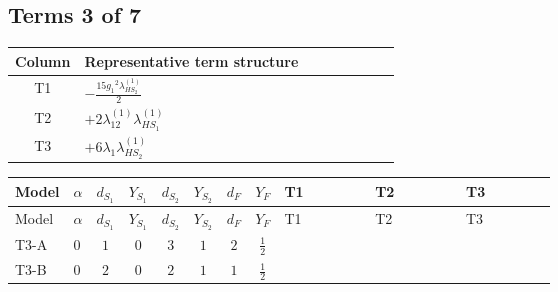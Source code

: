 \documentclass[8pt]{article}
\begin{document}
\begin{landscape}
\subsection*{Terms 3 of 7}
\begin{center}
\begin{tabular}{@{}c >{\raggedright\arraybackslash}p{0.82\linewidth}@{}}
\toprule
Column & Representative term structure \\
\midrule
T1 & \(\displaystyle -\frac{15 {g_1}^2 {\lambda_{HS_2}^{(1)}}}{2}\) \\
\midrule
T2 & \(\displaystyle +2 {\lambda_{12}^{(1)}} {\lambda_{HS_1}^{(1)}}\) \\
\midrule
T3 & \(\displaystyle +6 {\lambda_1} {\lambda_{HS_2}^{(1)}}\) \\
\midrule
\bottomrule
\end{tabular}
\end{center}
\smallskip
\tiny
\begin{longtable}{@{}llcccccc >{\raggedright\arraybackslash}p{0.21\linewidth} >{\raggedright\arraybackslash}p{0.21\linewidth} >{\raggedright\arraybackslash}p{0.21\linewidth}@{}}
\toprule
Model & $\alpha$ & $d_{S_1}$ & $Y_{S_1}$ & $d_{S_2}$ & $Y_{S_2}$ & $d_F$ & $Y_F$ & T1 & T2 & T3 \\
\midrule
\endfirsthead
\toprule
Model & $\alpha$ & $d_{S_1}$ & $Y_{S_1}$ & $d_{S_2}$ & $Y_{S_2}$ & $d_F$ & $Y_F$ & T1 & T2 & T3 \\
\midrule
\endhead
T3-A & $0$ & $1$ & $0$ & $3$ & $1$ & $2$ & $\frac{1}{2}$ & \scriptsize\adjustbox{max width=\linewidth}{$\begin{gathered} -\frac{15 {g_1}^2 {\lambda_{HS_2}^{(1)}}}{2}\end{gathered}$} & \scriptsize\adjustbox{max width=\linewidth}{$\begin{gathered} +2 {\lambda_{12}^{(1)}} {\lambda_{HS_1}^{(1)}}\end{gathered}$} & \scriptsize\adjustbox{max width=\linewidth}{$\begin{gathered} +6 {\lambda_1} {\lambda_{HS_2}^{(1)}}\end{gathered}$} \\
\midrule
T3-B & $0$ & $2$ & $0$ & $2$ & $1$ & $1$ & $\frac{1}{2}$ & \scriptsize\adjustbox{max width=\linewidth}{$\begin{gathered} -\frac{15 {g_1}^2 {\lambda_{HS_2}^{(1)}}}{2}\end{gathered}$} & \scriptsize\adjustbox{max width=\linewidth}{$\begin{gathered} +4 {\lambda_{12}^{(1)}} {\lambda_{HS_1}^{(1)}}\end{gathered}$} & \scriptsize\adjustbox{max width=\linewidth}{$\begin{gathered} +6 {\lambda_1} {\lambda_{HS_2}^{(1)}}\end{gathered}$} \\

\end{longtable}
\end{landscape}
\end{document}

